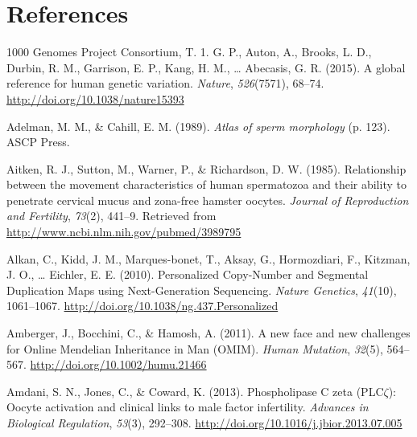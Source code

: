 \documentclass[12pt,twoside]{reedthesis}
\theoremstyle{definition}
\theoremstyle{definition}
\theoremstyle{remark}
\begin{document}
  \backmatter
  
  \chapter*{References}\label{references}
  
  \noindent
  
  \setlength{\parindent}{-0.20in} \setlength{\leftskip}{0.20in}
  \setlength{\parskip}{8pt}
  
  \hypertarget{refs}{}
  \hypertarget{ref-1000GenomesProjectConsortium2015}{}
  1000 Genomes Project Consortium, T. 1. G. P., Auton, A., Brooks, L. D.,
  Durbin, R. M., Garrison, E. P., Kang, H. M., \ldots{} Abecasis, G. R.
  (2015). A global reference for human genetic variation. \emph{Nature},
  \emph{526}(7571), 68--74. \url{http://doi.org/10.1038/nature15393}
  
  \hypertarget{ref-Adelman1989}{}
  Adelman, M. M., \& Cahill, E. M. (1989). \emph{Atlas of sperm
  morphology} (p. 123). ASCP Press.
  
  \hypertarget{ref-Aitken1985}{}
  Aitken, R. J., Sutton, M., Warner, P., \& Richardson, D. W. (1985).
  Relationship between the movement characteristics of human spermatozoa
  and their ability to penetrate cervical mucus and zona-free hamster
  oocytes. \emph{Journal of Reproduction and Fertility}, \emph{73}(2),
  441--9. Retrieved from \url{http://www.ncbi.nlm.nih.gov/pubmed/3989795}
  
  \hypertarget{ref-Alkan2010}{}
  Alkan, C., Kidd, J. M., Marques-bonet, T., Aksay, G., Hormozdiari, F.,
  Kitzman, J. O., \ldots{} Eichler, E. E. (2010). Personalized Copy-Number
  and Segmental Duplication Maps using Next-Generation Sequencing.
  \emph{Nature Genetics}, \emph{41}(10), 1061--1067.
  \url{http://doi.org/10.1038/ng.437.Personalized}
  
  \hypertarget{ref-Amberger2011}{}
  Amberger, J., Bocchini, C., \& Hamosh, A. (2011). A new face and new
  challenges for Online Mendelian Inheritance in Man (OMIM). \emph{Human
  Mutation}, \emph{32}(5), 564--567.
  \url{http://doi.org/10.1002/humu.21466}
  
  \hypertarget{ref-Amdani2013}{}
  Amdani, S. N., Jones, C., \& Coward, K. (2013). Phospholipase C zeta
  (PLC\(\zeta\)): Oocyte activation and clinical links to male factor
  infertility. \emph{Advances in Biological Regulation}, \emph{53}(3),
  292--308. \url{http://doi.org/10.1016/j.jbior.2013.07.005}
  
\end{document}
